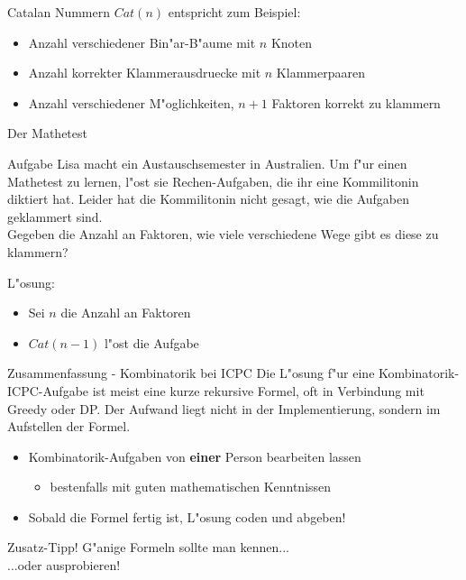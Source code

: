 \documentclass[18pt]{beamer}
\begin{document}
\begin{frame}{Catalan Nummern}
$Cat \left( n \right)$ entspricht zum Beispiel:
\begin{itemize}
\item Anzahl verschiedener Bin"ar-B"aume mit $n$ Knoten
\item Anzahl korrekter Klammerausdruecke mit $n$ Klammerpaaren
\item Anzahl verschiedener M"oglichkeiten, $n+1$ Faktoren korrekt zu klammern
\end{itemize}
\end{frame}

\begin{frame}{Der Mathetest}
\begin{block}{Aufgabe}
Lisa macht ein Austauschsemester in Australien. Um f"ur einen Mathetest zu lernen, l"ost sie Rechen-Aufgaben, die ihr eine Kommilitonin diktiert hat. Leider hat die Kommilitonin nicht gesagt, wie die Aufgaben geklammert sind. \\
Gegeben die Anzahl an Faktoren, wie viele verschiedene Wege gibt es diese zu klammern?
\end{block}
L"osung:
\begin{itemize}
\item Sei $n$ die Anzahl an Faktoren
\item $Cat \left( n-1 \right)$ l"ost die Aufgabe
\end{itemize}
\end{frame}

\begin{frame}{Zusammenfassung - Kombinatorik bei ICPC}
Die L"osung f"ur eine Kombinatorik-ICPC-Aufgabe ist meist eine kurze rekursive Formel, oft in Verbindung mit Greedy oder DP. Der Aufwand liegt nicht in der Implementierung, sondern im Aufstellen der Formel.
\begin{itemize}
\item Kombinatorik-Aufgaben von \textbf{einer} Person bearbeiten lassen

\begin{itemize}
\item bestenfalls mit guten mathematischen Kenntnissen
\end{itemize}

\item Sobald die Formel fertig ist, L"osung coden und abgeben!
\end{itemize}
\end{frame}

\begin{frame}{Zusatz-Tipp!}
G"anige Formeln sollte man kennen... \\
...oder ausprobieren! \\

\end{frame}
\end{document}
